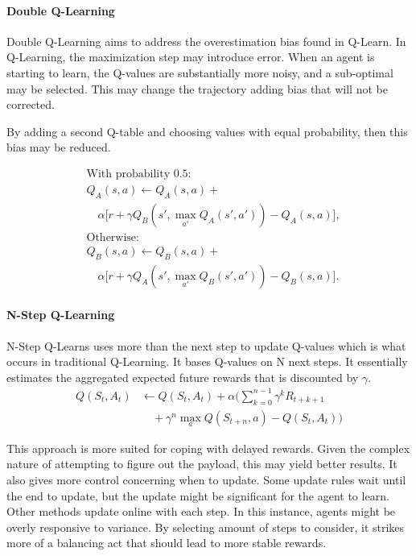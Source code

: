 \documentclass[conference]{IEEEtran}
\begin{document}
\paragraph{Double Q-Learning}
Double Q-Learning aims to address the overestimation bias found in Q-Learn. In Q-Learning, the maximization step may introduce error. When an agent is starting to learn, the Q-values are substantially more noisy, and a sub-optimal may be selected. This may change the trajectory adding bias that will not be corrected. 

By adding a second Q-table and choosing values with equal probability, then this bias may be reduced.

\begin{equation}
\begin{split}
    &\text{With probability 0.5:} \\
    &Q_A(s, a) \leftarrow Q_A(s, a) + \\
    &\quad \alpha \big[ r + \gamma Q_B\left(s', \max_{a'} Q_A(s', a')\right) - Q_A(s, a) \big], \\
    &\text{Otherwise:} \\
    &Q_B(s, a) \leftarrow Q_B(s, a) + \\
    &\quad \alpha \big[ r + \gamma Q_A\left(s', \max_{a'} Q_B(s', a')\right) - Q_B(s, a) \big].
\end{split}
\end{equation}

\paragraph{N-Step Q-Learning}
N-Step Q-Learns uses more than the next step to update Q-values which is what occurs in traditional Q-Learning. It bases Q-values on N next steps. It essentially estimates the aggregated expected future rewards that is discounted by $\gamma$.  
\begin{equation}
\begin{aligned}
Q(S_t, A_t) & \leftarrow Q(S_t, A_t) + \alpha \Bigg( \sum_{k=0}^{n-1} \gamma^k R_{t+k+1} \\
            & \quad + \gamma^n \max_a Q(S_{t+n}, a) - Q(S_t, A_t) \Bigg)
\end{aligned}
\end{equation}

This approach is more suited for coping with delayed rewards. Given the complex nature of attempting to figure out the payload, this may yield better results. It also gives more control concerning when to update. Some update rules wait until the end to update, but the update might be significant for the agent to learn. Other methods update online with each step. In this instance, agents might be overly responsive to variance. By selecting amount of steps to consider, it strikes more of a balancing act that should lead to more stable rewards.  
\end{document}
